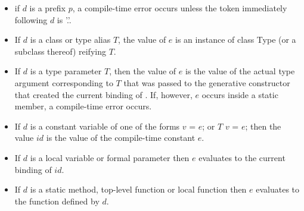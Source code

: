 \documentclass{article}
\newcommand{\code}[1]{{\sf #1}}
\begin{document}
\begin{itemize}
\item if $d$ is a prefix $p$, a compile-time error occurs unless the token immediately following $d$ is \code{'.'}.
\item If $d$ is a class or type alias $T$, the value of $e$ is an instance of  class \code{Type} (or a subclass thereof) reifying $T$.
\item If $d$ is a type parameter $T$, then the value of $e$ is the value of the actual type argument corresponding to $T$ that was  passed to the generative constructor that created the current binding of \THIS{}. If, however, $e$ occurs inside a static member, a compile-time error occurs.

 \item  If $d$ is a constant variable of one of the forms  \code{\CONST{} $v$ = $e$;} or \code{\CONST{} $T$ $v$ = $e$;} then the value $id$ is the value of the compile-time constant $e$.
\item If $d$ is a local variable or formal parameter then $e$ evaluates to the current binding of $id$.
\item If $d$ is a static method, top-level function or local function then $e$ evaluates to the function defined by $d$.

\end{itemize}
\end{document}
